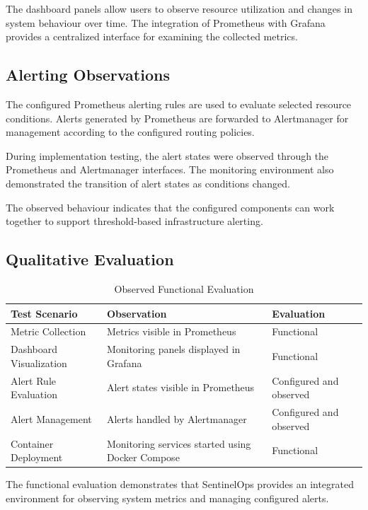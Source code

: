\documentclass[conference]{IEEEtran}
\begin{document}
The dashboard panels allow users to observe resource
utilization and changes in system behaviour over time.
The integration of Prometheus with Grafana provides a
centralized interface for examining the collected metrics.

\subsection{Alerting Observations}

The configured Prometheus alerting rules are used to
evaluate selected resource conditions. Alerts generated
by Prometheus are forwarded to Alertmanager for management
according to the configured routing policies.

During implementation testing, the alert states were
observed through the Prometheus and Alertmanager interfaces.
The monitoring environment also demonstrated the transition
of alert states as conditions changed.

The observed behaviour indicates that the configured
components can work together to support threshold-based
infrastructure alerting.

\subsection{Qualitative Evaluation}

\begin{table}[!t]
\caption{Observed Functional Evaluation}
\label{tab:results}
\centering
\footnotesize
\begin{tabular}{|p{2.4cm}|p{2.0cm}|p{2.5cm}|}
\hline
\textbf{Test Scenario} & \textbf{Observation} &
\textbf{Evaluation} \\
\hline
Metric Collection & Metrics visible in Prometheus &
Functional \\
\hline
Dashboard Visualization & Monitoring panels displayed in
Grafana & Functional \\
\hline
Alert Rule Evaluation & Alert states visible in Prometheus &
Configured and observed \\
\hline
Alert Management & Alerts handled by Alertmanager &
Configured and observed \\
\hline
Container Deployment & Monitoring services started using
Docker Compose & Functional \\
\hline
\end{tabular}
\end{table}

The functional evaluation demonstrates that SentinelOps
provides an integrated environment for observing system
metrics and managing configured alerts.
\end{document}
